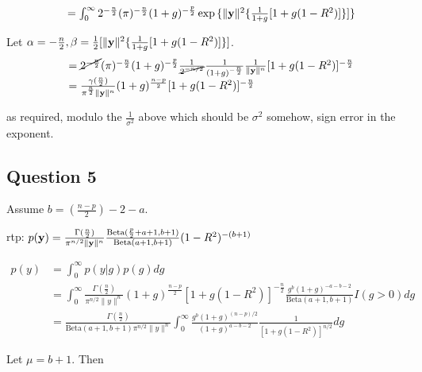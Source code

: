 \documentclass{amsart}[12pt]
\begin{document}
\begin{equation*}
\begin{array}{ll}
&= \int_0^\infty 2^{-\frac{n}{2}} (\pi)^{-\frac{n}{2}} (1 + g)^{-\frac{p}{2}} \exp{\{ \| {\bf y}\|^2 \{ \frac{1}{1 + g} [1 + g(1 - R^2)] \}} ] \}
\end{array}
\end{equation*}

Let $\alpha = -\frac{n}{2}, \beta = \tfrac{1}{2} [\| {\bf y} \|^2 \{ \frac{1}{1 + g} [1 + g(1 - R^2)] \}]$.
\begin{equation*}
\begin{array}{ll}
&= \cancel{2^{- \frac{n}{2}}} (\pi)^{-\frac{n}{2}} (1 + g)^{-\frac{p}{2}} \frac{1}{\cancel{2^{-n/2}}} \frac{1}{(1 + g)^{-\frac{n}{2}}} \frac{1}{\| {\bf y} \|^n} [1 + g(1 - R^2)]^{-\frac{n}{2}} \\
&= \frac{\gamma(\frac{n}{2})}{\pi^{\frac{n}{2}} \| {\bf y} \|^n} (1 + g)^{\frac{n - p}{2}} [1 + g(1 - R^2)]^{-\frac{n}{2}}
\end{array}
\end{equation*}

as required, modulo the $\frac{1}{\sigma^2}$ above which should be $\sigma^2$ somehow, sign error in the
exponent.

\subsection{Question 5}

Assume $b = (\frac{n - p}{2}) - 2 - a$.

rtp: $p({\bf y}) = \frac{\Gamma(\frac{n}{2})}{\pi^{n/2} \| {\bf y} \|^n} \frac{\text{Beta}(\frac{p}{2} + a + 1, b + 1)}{\text{Beta}(a + 1, b + 1)} (1 - R^2)^{-(b + 1)}$

\begin{equation*}
\begin{array}{ll}
p(y) &= \int_0^\infty p(y|g) p(g) dg \\
&= \int_0^\infty \frac{\Gamma(\frac{n}{2})}{\pi^{n/2} \| y \|^n} (1 + g)^{\frac{n - p}{2}}[1 + g(1 - R^2)]^{-\frac{n}{2}} \frac{g^b (1 + g)^{-a - b - 2}}{\text{Beta}(a + 1, b + 1)} I(g > 0) dg \\
&= \frac{\Gamma(\frac{n}{2})}{\text{Beta}(a + 1, b + 1) \pi^{n/2} \| y \|^n}
\int_0^\infty \frac{g^b (1 + g)^{(n - p)/2}}{(1 + g)^{a - b - 2}} \frac{1}{[1 + g(1 - R^2)]^{n/2}} dg
\end{array}
\end{equation*}

Let $\mu = b + 1$. Then
\end{document}
